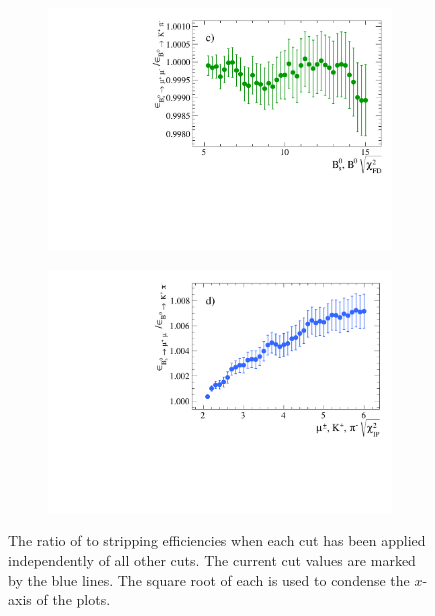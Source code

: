 \begin{figure}[htbp]
    \begin{subfigure}[b]{0.45\textwidth}
        \includegraphics[width=\textwidth]{./Figs/Selection/Bs2MuMu_KPi_FD.pdf}
        \label{fig:FD_ratioKPi}
    \end{subfigure}
   \begin{subfigure}[b]{0.45\textwidth}
        \includegraphics[width=\textwidth]{./Figs/Selection/Bs2MuMu_KPi_daughter_IP.pdf}
        \label{fig:IPS_ratioKPi}
    \end{subfigure}
    \caption{The ratio of \bsmumu to \bdkpi stripping efficiencies when each cut has been applied independently of all other cuts. The current cut values are marked by the blue lines. The square root of each \chisqd is used to condense the $x$-axis of the plots.}
    \label{fig:ratio_plotsBd2KPi}
\end{figure}


